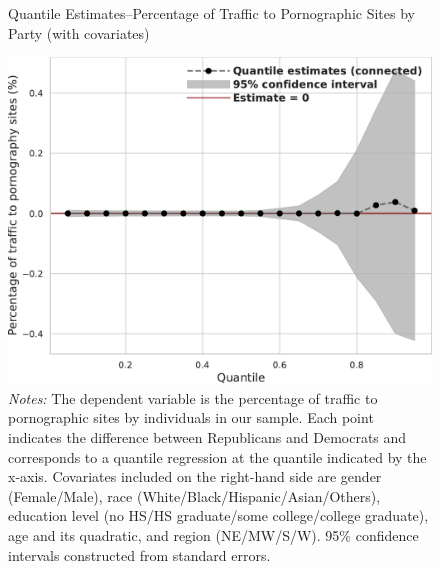 \documentclass[12pt, letterpaper]{article}
\begin{document}
\begin{figure}
	\centering
	\caption{Quantile Estimates--Percentage of Traffic to Pornographic Sites by Party (with covariates)}
	\includegraphics[width=.55\linewidth]{figs/quantile_reg_covariates_proportion_visits_adult.pdf}
	\caption*{\footnotesize \emph{Notes:} 
		The dependent variable is the percentage of traffic to pornographic sites by individuals in our sample.
		Each point indicates the difference between Republicans and Democrats and corresponds to a quantile regression at the quantile indicated by the x-axis.
		Covariates included on the right-hand side are gender (Female/Male), race (White/Black/Hispanic/Asian/Others), education level (no HS/HS graduate/some college/college graduate), age and its quadratic, and region (NE/MW/S/W).
		95\% confidence intervals constructed from standard errors.
	}
	\label{fig:quantile_regression_prop_visits_covariates}
\end{figure}
\end{document}
